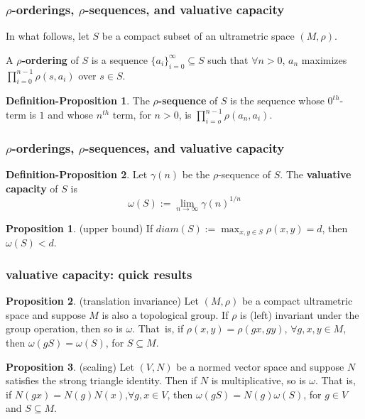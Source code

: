 \documentclass{beamer}
\theoremstyle{definition}
\newtheorem*{proposition*}{Proposition}
\newtheorem{definition_proposition}{Definition-Proposition}
\begin{document}
\begin{frame}
\frametitle{$\rho$-orderings, $\rho$-sequences, and valuative capacity}
In what follows, let $S$ be a compact subset of an ultrametric space $(M,\rho)$.
\begin{definition}
\cite{kj} A \textbf{$\rho$-ordering} of $S$ is a sequence $\{a_i\}_{i=0}^\infty \subseteq S$ such that $\forall n > 0$, $a_n$ maximizes $\prod_{i=0}^{n-1} \rho(s,a_i)$ over $s \in S$. 
\end{definition}

\begin{definition_proposition}
\cite{kj} The \textbf{$\rho$-sequence} of $S$ is the sequence whose $0^{th}$-term is $1$ and whose $n^{th}$ term, for $n >0$, is $\prod_{i=o}^{n-1} \rho(a_n,a_i)$.
\end{definition_proposition}

\end{frame}

\begin{frame}
\frametitle{$\rho$-orderings, $\rho$-sequences, and valuative capacity}
\begin{definition_proposition}
\cite{kj}  Let $\gamma(n)$ be the $\rho$-sequence of $S$. The \textbf{valuative capacity} of $S$ is \[\omega(S)
 := \lim_{n\to\infty} \gamma(n)^{1/n}\]  
\end{definition_proposition}


\begin{proposition*}
(upper bound) If $diam(S)  := \max_{x,y \in S} \rho(x,y)= d$, then $\omega(S) < d$.
\end{proposition*}

\end{frame}


\begin{frame}
\frametitle{valuative capacity: quick results}
\begin{proposition*}
	(translation invariance) Let $(M, \rho)$ be a compact ultrametric space and suppose $M$ is also a topological group. If $\rho$ is (left) invariant under the group operation, then so is $\omega$. That\ is, if $\rho(x,y)=\rho(gx,gy)$, $ \forall g,x,y \in M$, then $\omega(gS)=\omega(S)$, for $S \subseteq M$.	
\end{proposition*}

\begin{proposition*}
(scaling) Let $(V, N)$ be a normed vector space and suppose $N$ satisfies the strong triangle identity. Then if $N$ is multiplicative, so is $\omega$. That is, if $N(gx)=N(g)N(x)$,$\forall g,x \in V$, then $\omega(gS) = N(g)  \omega(S)$, for $g \in V$ and $S \subseteq M$. 
\end{proposition*}
\end{frame}
\end{document}
